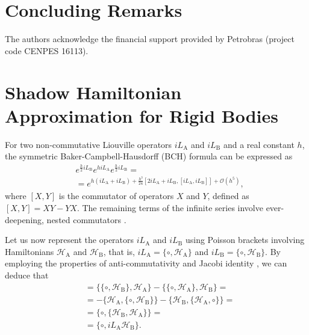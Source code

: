 \documentclass[
journal=jctcce,
layout=twocolumn
]{achemso}
\newcommand{\Ham}[1]{{\mathcal H}_\text{#1}}    %
\newcommand{\Liu}[1]{i\!L_\text{#1}}            %
\newcommand{\timestep}{h}
\begin{document}
\section{Concluding Remarks}
\label{sec:conclusion}

\begin{acknowledgement}
	The authors acknowledge the financial support provided by Petrobras (project code CENPES 16113).
\end{acknowledgement}

\appendix
{}

\section{Shadow Hamiltonian Approximation for Rigid Bodies}
\label{sec:rigid body shadow hamiltonian}

For two non-commutative Liouville operators $\Liu A$ and $\Liu B$ and a real constant $\timestep$, the symmetric Baker-Campbell-Hausdorff (BCH) formula can be expressed as \cite{Hairer_2006}
\begin{equation}
\label{eq:symmetric BCH}
\begin{split}
&e^{\frac{\timestep}{2} \Liu B} e^{\timestep \Liu A} e^{\frac{\timestep}{2} \Liu B} = \\
&= e^{\timestep (\Liu A + \Liu B) + \frac{\timestep^3}{24} \left[2 \Liu A + \Liu B,[\Liu A,\Liu B]\right] + \mathcal{O}(\timestep^5)},
\end{split}
\end{equation}
where $[X,Y]$ is the commutator of operators $X$ and $Y$, defined as $[X,Y] = XY - YX$.
The remaining terms of the infinite series involve ever-deepening, nested commutators \cite{Hairer_2006}.

Let us now represent the operators $\Liu A$ and $\Liu B$ using Poisson brackets involving Hamiltonians $\Ham A$ and $\Ham B$, that is, $\Liu A = \{\circ,\Ham A\}$ and $\Liu B = \{\circ,\Ham B\}$.
By employing the properties of anti-commutativity and Jacobi identity \cite{Hairer_2006}, we can deduce that
\begin{align*}
[\Liu A,\Liu B] &= \{\{\circ,\Ham B\},\Ham A\} - \{\{\circ,\Ham A\},\Ham B\} = \\
&= -\{\Ham A,\{\circ,\Ham B\}\} - \{\Ham B,\{\Ham A,\circ\}\} = \\
&= \{\circ,\{\Ham B,\Ham A\}\} = \\
&= \{\circ,{\Liu A} {\Ham B}\}.
\end{align*}
\end{document}
